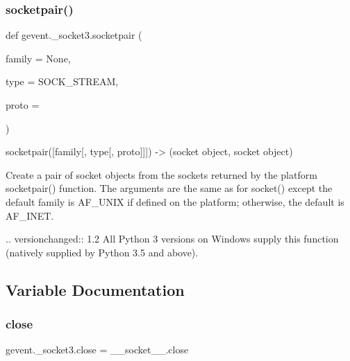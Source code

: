 \subsubsection{\texorpdfstring{socketpair()}{socketpair()}}
{\footnotesize\ttfamily def gevent.\+\_\+socket3.\+socketpair (\begin{DoxyParamCaption}\item[{}]{family = {\ttfamily None},  }\item[{}]{type = {\ttfamily SOCK\+\_\+STREAM},  }\item[{}]{proto = {} }\end{DoxyParamCaption})}

\begin{DoxyVerb}socketpair([family[, type[, proto]]]) -> (socket object, socket object)

Create a pair of socket objects from the sockets returned by the platform
socketpair() function.
The arguments are the same as for socket() except the default family is
AF_UNIX if defined on the platform; otherwise, the default is AF_INET.

.. versionchanged:: 1.2
   All Python 3 versions on Windows supply this function (natively
   supplied by Python 3.5 and above).
\end{DoxyVerb}
 

\subsection{Variable Documentation}
\mbox{\label{namespacegevent_1_1__socket3_ac3701a95ca7cd9fe3f54cfa93e942647}} 
\subsubsection{\texorpdfstring{close}{close}}
{\footnotesize\ttfamily gevent.\+\_\+socket3.\+close = \+\_\+\+\_\+socket\+\_\+\+\_\+.\+close}

\mbox{\label{namespacegevent_1_1__socket3_a6b4d9ca5ec84530d82ded6d7c1a0f625}} 
